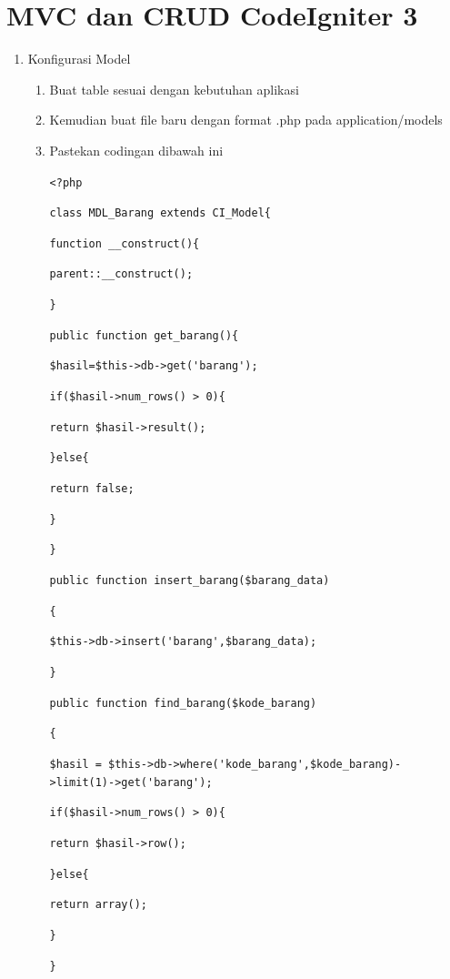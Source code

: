 \section{MVC dan CRUD CodeIgniter 3}
\begin{enumerate}
    \item Konfigurasi Model
    \begin{enumerate}
        \item Buat table sesuai dengan kebutuhan aplikasi
        \item Kemudian buat file baru dengan format .php pada application/models
        \item Pastekan codingan dibawah ini
            \par \verb|<?php|\par
            \verb|class MDL_Barang extends CI_Model{|\par
            \verb|function __construct(){|\par
            \verb|parent::__construct();|\par
            \verb|}|\par
            \verb|public function get_barang(){|\par
            \verb|$hasil=$this->db->get('barang');|\par
            \verb|if($hasil->num_rows() > 0){|\par
            \verb|return $hasil->result();|\par
            \verb|}else{|\par
            \verb|return false;|\par
            \verb|}|\par
            \verb|}|\par
            
            \verb|public function insert_barang($barang_data)|\par
            \verb|{|\par
            \verb|$this->db->insert('barang',$barang_data);|\par
            \verb|}|\par
            
            \verb|public function find_barang($kode_barang)|\par
            \verb|{|\par
            \verb|$hasil = $this->db->where('kode_barang',$kode_barang)->limit(1)->get('barang');|\par
            \verb|if($hasil->num_rows() > 0){|\par
            \verb|return $hasil->row();|\par
            \verb|}else{|\par
            \verb|return array();|\par
            \verb|}|\par
            \verb|}|\par
            

\end{enumerate}
\end{enumerate}
